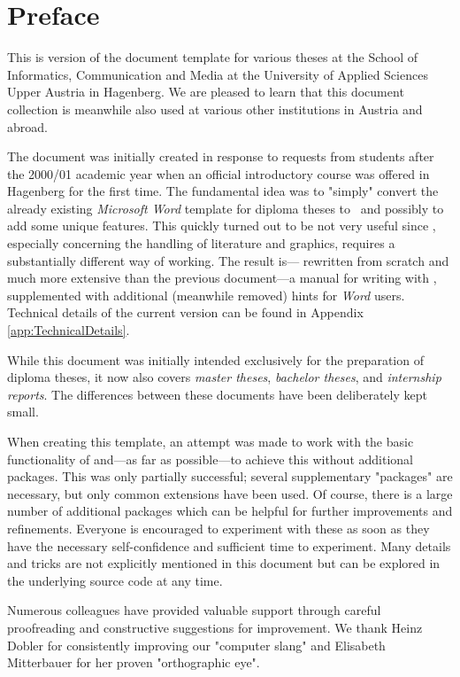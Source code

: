 \chapter{Preface} %

This is version \textbf{\hgbDate} of the \latex document template for various
theses at the School of Informatics, Communication and Media at the University
of Applied Sciences Upper Austria in Hagenberg. We are pleased to learn that this
document collection is meanwhile also used at various other institutions in Austria
and abroad.

The document was initially created in response to requests from students after
the 2000/01 academic year when an official \latex introductory course was
offered in Hagenberg for the first time. The fundamental idea was to
"simply" convert the already existing \emph{Microsoft Word} template for
diploma theses to \latex\ and possibly to add some unique features. This quickly
turned out to be not very useful since \latex, especially concerning the
handling of literature and graphics, requires a substantially different way of
working. The result is--- rewritten from scratch and much more extensive than
the previous document---a manual for writing with \latex, supplemented with
additional (meanwhile removed) hints for \emph{Word} users. Technical details
of the current version can be found in Appendix \ref{app:TechnicalDetails}.

While this document was initially intended exclusively for the preparation
of diploma theses, it now also covers \emph{master theses},
\emph{bachelor theses}, and \emph{internship reports}. The differences between
these documents have been deliberately kept small.


When creating this template, an attempt was made to work with the basic
functionality of \latex and---as far as possible---to achieve this without
additional packages. This was only partially successful; several supplementary
"packages" are necessary, but only common extensions have been used. Of course,
there is a large number of additional packages which can be helpful for further
improvements and refinements. Everyone is encouraged to experiment with these as
soon as they have the necessary self-confidence and sufficient time to
experiment. Many details and tricks are not explicitly mentioned in this
document but can be explored in the underlying source code at any time.

Numerous colleagues have provided valuable support through careful proofreading
and constructive suggestions for improvement. We thank Heinz Dobler for
consistently improving our "computer slang" and Elisabeth Mitterbauer for her
proven "orthographic eye".

